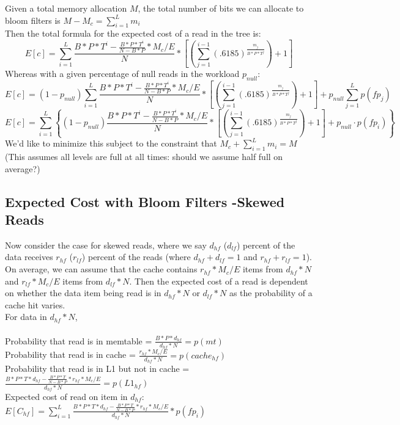 \documentclass[11pt]{article}
\theoremstyle{plain}
\theoremstyle{definition}
\begin{document}
Given a total memory allocation $M$, the total number of bits we can allocate to bloom filters is $M-M_c = \sum_{i=1}^L m_i$ \\
Then the total formula for the expected cost of a read in the tree is: 
$$E[c] = \sum_{i=1}^{L} \frac{B*P*T^i - \frac{B*P*T^i}{N-B*P} * M_c/E}{N} * \left[ \left(\sum_{j=1}^{i-1} (.6185) ^  {\frac{m_j}{B*P*T^j}}\right) +1 \right]$$ 
Whereas with a given percentage of null reads in the workload $p_{null}$:
$$E[c] = (1-p_{null})\sum_{i=1}^{L} \frac{B*P*T^i - \frac{B*P*T^i}{N-B*P} * M_c/E}{N} * \left[ \left(\sum_{j=1}^{i-1} (.6185) ^  {\frac{m_j}{B*P*T^j}}\right) +1 \right] + p_{null}\sum_{j=1}^{L} p(fp_j)$$
$$E[c] = \sum_{i=1}^{L} \left\{(1-p_{null})\frac{B*P*T^i - \frac{B*P*T^i}{N-B*P} * M_c/E}{N} * \left[ \left(\sum_{j=1}^{i-1} (.6185) ^  {\frac{m_j}{B*P*T^j}}\right) +1 \right] + p_{null} \cdot p(fp_i) \right\}$$
We'd like to minimize this subject to the constraint that $M_c + \sum_{i=1}^L m_i = M$ \\
(This assumes all levels are full at all times: should we assume half full on average?)

\subsection{Expected Cost with Bloom Filters -Skewed Reads}

Now consider the case for skewed reads, where we say $d_{hf}$ ($d_{lf}$) percent of the data receives $r_{hf}$ ($r_{lf}$) percent of the reads (where $d_{hf} + d_{lf} = 1$ and $r_{hf} + r_{lf} = 1$). On average, we can assume that the cache contains $r_{hf} * M_c/E$ items from $d_{hf} * N$ and $r_{lf} * M_c/E$ items from $d_{lf} * N$. Then the expected cost of a read is dependent on whether the data item being read is in $d_{hf} * N$ or $d_{lf} * N$ as the probability of a cache hit varies.\\
For data in $d_{hf} * N$, \\ \\
Probability that read is in memtable = $\frac{B*P*d_{hf}}{d_{hf} *N}  = p(mt)$\\
Probability that read is in cache = $\frac{r_{hf} * M_c/E}{d_{hf} * N} = p(cache_{hf})$ \\
Probability that read is in L1 but not in cache = $ \frac{B*P * T*d_{hf} - \frac{B*P * T}{N-B*P} * r_{hf} * M_c/E}{d_{hf} * N}  = p(L1_{hf})$ \\
Expected cost of read on item in $d_{hf}$: $E[C_{hf}]= \sum_{i=1}^L \frac{B*P * T*d_{hf} - \frac{B*P * T}{N-B*P} * r_{hf} * M_c/E}{d_{hf} * N} * p(fp_i)$\\ \\
\end{document}
